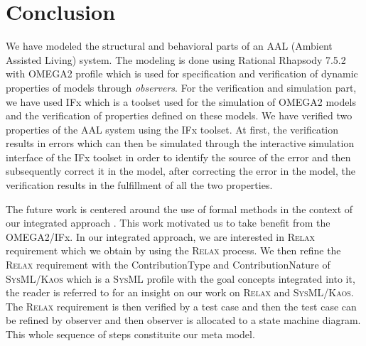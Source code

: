 \documentclass[a4paper,twoside]{article}
\def\myrelax{\textsc{Relax}}                  %
\def\sysml{\textsc{SysML}}
\def\kaos{\textsc{Kaos}}
\begin{document}
\section{{Conclusion}
\label{sec:conclusion}}
We have modeled the structural and behavioral parts of an AAL (Ambient Assisted Living) system. The modeling is done using Rational Rhapsody 7.5.2  with OMEGA2 profile which is used for specification and verification of dynamic properties of models through \textit{observers}. For the verification and simulation part, we have used IFx which is a toolset used for the simulation of OMEGA2 models and the verification of properties defined on these models. We have verified two properties of the AAL system using the IFx toolset. At first, the verification results in errors which can then be simulated through the interactive simulation interface of the IFx toolset in order to identify the source of the error and then subsequently correct it in the model, after correcting the error in the model, the verification results in the fulfillment of all the two properties. 

The future work is centered around the use of formal methods in the context of our integrated approach \cite{test18}. This work motivated us to take benefit from the OMEGA2/IFx. In our integrated approach, we are interested in \myrelax{} requirement which we obtain by using the \myrelax{} process. We then refine the \myrelax{} requirement with the ContributionType and ContributionNature of \sysml{}/\kaos{} which is a \sysml{} profile with the goal concepts integrated into it, the reader is referred to \cite{test7} for an insight on our work on \myrelax{} and \sysml{}/\kaos{}. The \myrelax{} requirement is then verified by a test case and then the test case can be refined by observer and then observer is allocated to a state machine diagram. This whole sequence of steps constituite our meta model.

\end{document}
